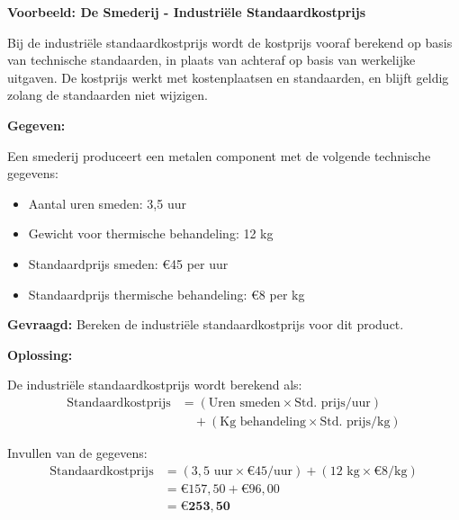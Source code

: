 \documentclass[a4paper,11pt]{article}
\begin{document}
\begin{description}
          \begin{oefenblok}
              \textbf{Voorbeeld: De Smederij - Industriële Standaardkostprijs}

              Bij de industriële standaardkostprijs wordt de kostprijs vooraf berekend op basis van technische standaarden,
              in plaats van achteraf op basis van werkelijke uitgaven. De kostprijs werkt met kostenplaatsen en standaarden,
              en blijft geldig zolang de standaarden niet wijzigen.

              \textbf{Gegeven:}

              Een smederij produceert een metalen component met de volgende technische gegevens:
              \begin{itemize}
                  \item Aantal uren smeden: 3,5 uur
                  \item Gewicht voor thermische behandeling: 12 kg
                  \item Standaardprijs smeden: €45 per uur
                  \item Standaardprijs thermische behandeling: €8 per kg
              \end{itemize}

              \textbf{Gevraagd:} Bereken de industriële standaardkostprijs voor dit product.

              \textbf{Oplossing:}

              De industriële standaardkostprijs wordt berekend als:
              \begin{align*}
                  \text{Standaardkostprijs} & = (\text{Uren smeden} \times \text{Std. prijs/uur})         \\
                                            & \quad + (\text{Kg behandeling} \times \text{Std. prijs/kg})
              \end{align*}

              Invullen van de gegevens:
              \begin{align*}
                  \text{Standaardkostprijs} & = (3,5 \text{ uur} \times €45/\text{uur}) + (12 \text{ kg} \times €8/\text{kg}) \\
                                            & = €157,50 + €96,00                                                              \\
                                            & = \mathbf{€253,50}
              \end{align*}


\end{oefenblok}
\end{description}
\end{document}
